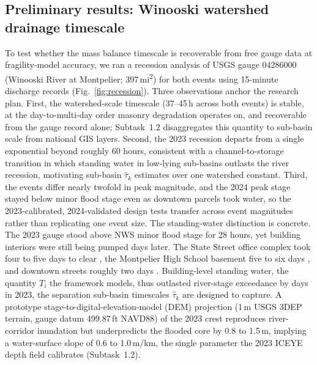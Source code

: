 \documentclass[11pt]{article}
\begin{document}
\subsection{Preliminary results: Winooski watershed drainage timescale}
To test whether the mass balance timescale is recoverable from free gauge data at
fragility-model accuracy, we ran a recession analysis of USGS gauge 04286000
(Winooski River at Montpelier; 397\,mi\textsuperscript{2}) for both events using
15-minute discharge records (Fig.~\ref{fig:recession}).
Three observations anchor the research plan.
First, the watershed-scale timescale (37--45\,h across both events) is stable, at the
day-to-multi-day order masonry degradation operates on, and recoverable from the
gauge record alone; Subtask~1.2 disaggregates this quantity to sub-basin scale
from national GIS layers.
Second, the 2023 recession departs from a single exponential beyond roughly
60 hours, consistent with a channel-to-storage transition
in which standing water in low-lying sub-basins outlasts the river recession, motivating
sub-basin $\hat{\tau}_k$ estimates over one watershed constant.
Third, the events differ nearly twofold in peak magnitude, and the 2024 peak
stage stayed below minor flood stage even as downtown parcels took
water, so the 2023-calibrated, 2024-validated design tests transfer across event
magnitudes rather than replicating one event size.
The standing-water distinction is concrete. The
2023 gauge stood above NWS minor flood stage for 28 hours, yet building interiors
were still being pumped days later. The
State Street office complex took four to five days to clear
\cite{vermontpublic2023stateflood}, the Montpelier High School basement five to
six days \cite{vtdigger2023schools}, and downtown streets roughly two days
\cite{vermontpublic2023recede}.
Building-level standing water, the quantity $T_i$ the framework models, thus
outlasted river-stage exceedance by days in 2023, the separation sub-basin
timescales $\hat{\tau}_k$ are designed to capture.
A prototype stage-to-digital-elevation-model (DEM) projection (1\,m USGS 3DEP
terrain, gauge datum 499.87\,ft NAVD88) of the 2023 crest reproduces
river-corridor inundation but underpredicts the flooded core by 0.8 to 1.5\,m,
implying a water-surface slope of 0.6 to 1.0\,m/km, the single parameter the
2023 ICEYE depth field calibrates (Subtask~1.2).
\end{document}
